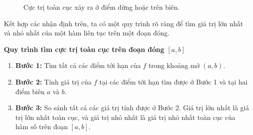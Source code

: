 \begin{figure}[H]
    \centering
    \caption{Cực trị toàn cục xảy ra ở điểm dừng hoặc trên biên.}
    \label{fig:cuc-tri-toan-cuc-dashed-grid}
\end{figure}

Kết hợp các nhận định trên, ta có một quy trình rõ ràng để tìm giá trị lớn nhất và nhỏ nhất của một hàm liên tục trên một đoạn đóng.

\begin{importantbox}
    \textbf{Quy trình tìm cực trị toàn cục trên đoạn đóng $[a,b]$}
    \begin{enumerate}
    \item \textbf{Bước 1:} Tìm tất cả các điểm tới hạn của $f$ trong khoảng mở $(a,b)$.
    \item \textbf{Bước 2:} Tính giá trị của $f$ tại các điểm tới hạn tìm được ở Bước 1 và tại hai điểm biên $a$ và $b$.
    \item \textbf{Bước 3:} So sánh tất cả các giá trị tính được ở Bước 2. Giá trị lớn nhất là giá trị lớn nhất toàn cục, và giá trị nhỏ nhất là giá trị nhỏ nhất toàn cục của hàm số trên đoạn $[a,b]$.
    \end{enumerate}
\end{importantbox}

